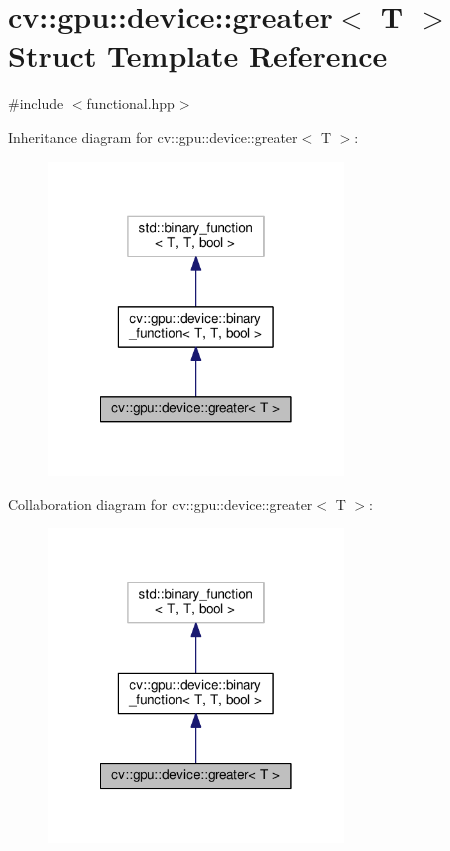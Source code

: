 \hypertarget{structcv_1_1gpu_1_1device_1_1greater}{\section{cv\-:\-:gpu\-:\-:device\-:\-:greater$<$ T $>$ Struct Template Reference}
\label{structcv_1_1gpu_1_1device_1_1greater}
}


{\ttfamily \#include $<$functional.\-hpp$>$}



Inheritance diagram for cv\-:\-:gpu\-:\-:device\-:\-:greater$<$ T $>$\-:\nopagebreak
\begin{figure}[H]
\begin{center}
\leavevmode
\includegraphics[width=222pt]{structcv_1_1gpu_1_1device_1_1greater__inherit__graph}
\end{center}
\end{figure}


Collaboration diagram for cv\-:\-:gpu\-:\-:device\-:\-:greater$<$ T $>$\-:\nopagebreak
\begin{figure}[H]
\begin{center}
\leavevmode
\includegraphics[width=222pt]{structcv_1_1gpu_1_1device_1_1greater__coll__graph}
\end{center}
\end{figure}
